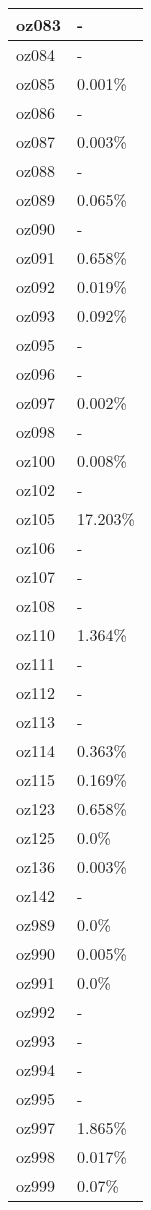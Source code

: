 \documentclass{article}%
\begin{document}
\begin{longtabu}{X[l] X[r]}
\hline%
oz083&{-}\\%
\hline%
oz084&{-}\\%
\hline%
oz085&0.001\%\\%
\hline%
oz086&{-}\\%
\hline%
oz087&0.003\%\\%
\hline%
oz088&{-}\\%
\hline%
oz089&0.065\%\\%
\hline%
oz090&{-}\\%
\hline%
oz091&0.658\%\\%
\hline%
oz092&0.019\%\\%
\hline%
oz093&0.092\%\\%
\hline%
oz095&{-}\\%
\hline%
oz096&{-}\\%
\hline%
oz097&0.002\%\\%
\hline%
oz098&{-}\\%
\hline%
oz100&0.008\%\\%
\hline%
oz102&{-}\\%
\hline%
oz105&17.203\%\\%
\hline%
oz106&{-}\\%
\hline%
oz107&{-}\\%
\hline%
oz108&{-}\\%
\hline%
oz110&1.364\%\\%
\hline%
oz111&{-}\\%
\hline%
oz112&{-}\\%
\hline%
oz113&{-}\\%
\hline%
oz114&0.363\%\\%
\hline%
oz115&0.169\%\\%
\hline%
oz123&0.658\%\\%
\hline%
oz125&0.0\%\\%
\hline%
oz136&0.003\%\\%
\hline%
oz142&{-}\\%
\hline%
oz989&0.0\%\\%
\hline%
oz990&0.005\%\\%
\hline%
oz991&0.0\%\\%
\hline%
oz992&{-}\\%
\hline%
oz993&{-}\\%
\hline%
oz994&{-}\\%
\hline%
oz995&{-}\\%
\hline%
oz997&1.865\%\\%
\hline%
oz998&0.017\%\\%
\hline%
oz999&0.07\%\\%
\hline%
\end{longtabu}%
\end{document}
